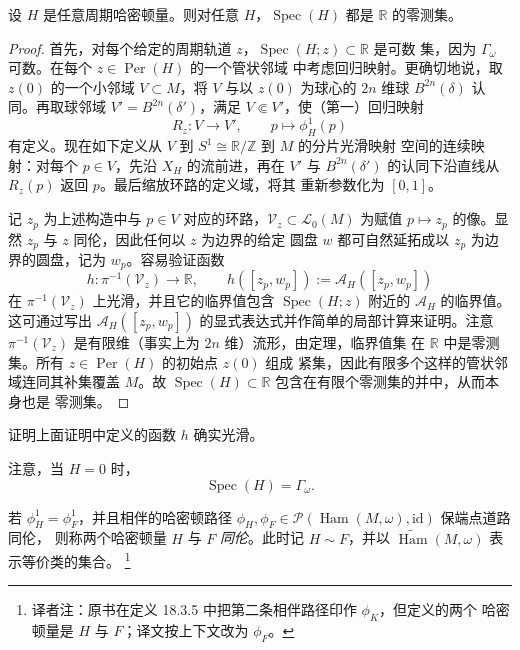 \begin{lemma}
\label{lem:18-action-spectrum-measure-zero}
设 $H$ 是任意周期哈密顿量。则对任意 $H$，$\operatorname{Spec}(H)$ 都是
$\mathbb R$ 的零测集。
\end{lemma}

\begin{proof}
首先，对每个给定的周期轨道 $z$，$\operatorname{Spec}(H;z)\subset\mathbb R$ 是可数
集，因为 $\Gamma_\omega$ 可数。在每个 $z\in\operatorname{Per}(H)$ 的一个管状邻域
中考虑\personPoincare{}回归映射。更确切地说，取 $z(0)$ 的一个小邻域 $V\subset M$，将
$V$ 与以 $z(0)$ 为球心的 $2n$ 维球 $B^{2n}(\delta)$ 认同。再取球邻域
$V'=B^{2n}(\delta')$，满足 $V\Subset V'$，使（第一）\personPoincare{}回归映射
\[
 R_z:V\longrightarrow V',\qquad p\longmapsto\phi_H^1(p)
\]
有定义。现在如下定义从 $V$ 到 $S^1\cong\mathbb R/\mathbb Z$ 到 $M$ 的分片光滑映射
空间的连续映射：对每个 $p\in V$，先沿 $X_H$ 的流前进，再在 $V'$ 与
$B^{2n}(\delta')$ 的认同下沿直线从 $R_z(p)$ 返回 $p$。最后缩放环路的定义域，将其
重新参数化为 $[0,1]$。

记 $z_p$ 为上述构造中与 $p\in V$ 对应的环路，$\mathcal V_z\subset\mathcal L_0(M)$
为赋值 $p\mapsto z_p$ 的像。显然 $z_p$ 与 $z$ 同伦，因此任何以 $z$ 为边界的给定
圆盘 $w$ 都可自然延拓成以 $z_p$ 为边界的圆盘，记为 $w_p$。容易验证函数
\[
 h:\pi^{-1}(\mathcal V_z)\longrightarrow\mathbb R,
 \qquad h([z_p,w_p]):=\mathcal A_H([z_p,w_p])
\]
在 $\pi^{-1}(\mathcal V_z)$ 上光滑，并且它的临界值包含
$\operatorname{Spec}(H;z)$ 附近的 $\mathcal A_H$ 的临界值。这可通过写出
$\mathcal A_H([z_p,w_p])$ 的显式表达式并作简单的局部计算来证明。注意
$\pi^{-1}(\mathcal V_z)$ 是有限维（事实上为 $2n$ 维）流形，由\personSard{}定理，临界值集
在 $\mathbb R$ 中是零测集。所有 $z\in\operatorname{Per}(H)$ 的初始点 $z(0)$ 组成
紧集，因此有限多个这样的管状邻域连同其补集覆盖 $M$。故
$\operatorname{Spec}(H)\subset\mathbb R$ 包含在有限个零测集的并中，从而本身也是
零测集。
\end{proof}

\begin{exercise}
\label{ex:18-smoothness-local-action-function}
证明上面证明中定义的函数 $h$ 确实光滑。
\end{exercise}

注意，当 $H=0$ 时，
\[
 \operatorname{Spec}(H)=\Gamma_\omega.
\]

\begin{definition}
\label{def:18-homotopic-hamiltonians}
若 $\phi_H^1=\phi_F^1$，并且相伴的哈密顿路径
$\phi_H,\phi_F\in\mathcal P(\operatorname{Ham}(M,\omega),\mathrm{id})$ 保端点道路同伦，
则称两个哈密顿量 $H$ 与 $F$ \emph{同伦}。此时记 $H\sim F$，并以
$\widetilde{\operatorname{Ham}}(M,\omega)$ 表示等价类的集合。
\footnote{译者注：原书在定义 18.3.5 中把第二条相伴路径印作 $\phi_K$，但定义的两个
哈密顿量是 $H$ 与 $F$；译文按上下文改为 $\phi_F$。}
\end{definition}

